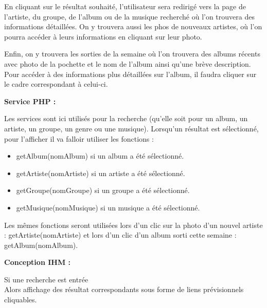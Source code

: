 			\begin{paragraphe}
				En cliquant sur le résultat souhaité, l'utilisateur sera redirigé vers la page de l'artiste, du groupe, de l'album ou de la musique recherché où l'on trouvera des informations détaillées. On y trouvera aussi les phos de nouveaux artistes, où l'on pourra accéder à leurs informations en cliquant sur leur photo.
			\end{paragraphe}

			\begin{paragraphe}
				Enfin, on y trouvera les sorties de la semaine où l'on trouvera des albums récents avec photo de la pochette et le nom de l'album ainsi qu'une brève description. Pour accéder à des informations plus détaillées sur l'album, il faudra cliquer sur le cadre correspondant à celui-ci.
			\end{paragraphe}

			\begin{paragraphe}
				\textbf{Service PHP :}
			\end{paragraphe}

			\begin{paragraphe}
				Les services sont ici utilisés pour la recherche (qu'elle soit pour un album, un artiste, un groupe, un genre ou une musique). Lorsqu'un résultat est sélectionné, pour l'afficher il va falloir utiliser les fonctions :
				\begin{itemize}
					\item getAlbum(nomAlbum) si un album a été sélectionné.
					\item getArtiste(nomArtiste) si un artiste a été sélectionné.
					\item getGroupe(nomGroupe) si un groupe a été sélectionné.
					\item getMusique(nomMusique) si un musique a été sélectionné.
				\end{itemize}
				Les mêmes fonctions seront utilisées lors d'un clic sur la photo d'un nouvel artiste : getArtiste(nomArtiste) et lors d'un clic d'un album sorti cette semaine : getAlbum(nomAlbum).
			\end{paragraphe}

			\begin{paragraphe}
				\textbf{Conception IHM :}
			\end{paragraphe}


			\begin{paragraphe}
				Si une recherche est entrée \\
				Alors affichage des résultat correspondants sous forme de liens prévisionnels cliquables.
			\end{paragraphe}

